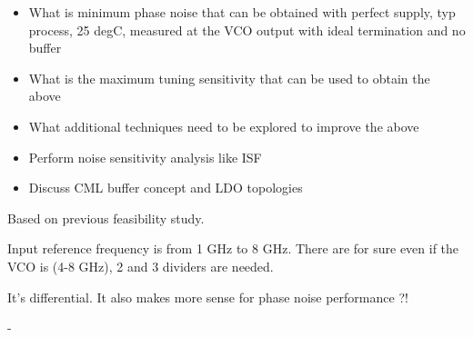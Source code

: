 \documentclass{article}
\begin{document}

\begin{itemize}

	\item What is minimum phase noise that can be obtained with perfect supply, typ process, 25 degC, measured at the VCO output with ideal termination and no buffer
	\item What is the maximum  tuning sensitivity that can be used to obtain the above
	\item What additional techniques need to be explored to improve the above
	\item Perform noise sensitivity analysis like ISF
	\item Discuss CML buffer concept and LDO topologies %
	
\end{itemize}


\begin{question}
	Based on previous feasibility study.
\end{question}

\begin{question}
	Input reference frequency is from 1 GHz to 8 GHz. There are for sure even if the VCO is (4-8 GHz), 2 and 3 dividers are needed.
\end{question}

\begin{question}
	It's differential. It also makes more sense for phase noise performance ?!
\end{question}

\begin{question}
	-
\end{question}



\end{document}
